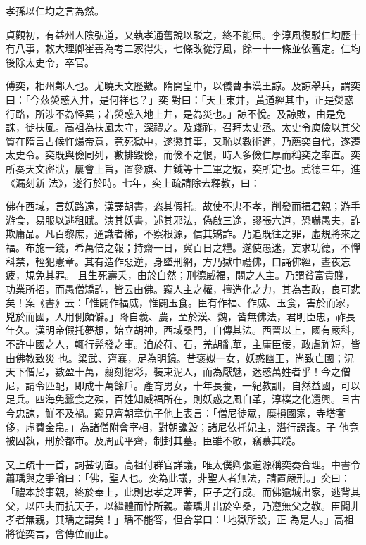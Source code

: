 \begin{pinyinscope}
 孝孫以仁均之言為然。



 貞觀初，有益州人陰弘道，又執孝通舊說以駁之，終不能屈。李淳風復駁仁均歷十有八事，敕大理卿崔善為考二家得失，七條改從淳風，餘一十一條並依舊定。仁均後除太史令，卒官。



 傅奕，相州鄴人也。尤曉天文歷數。隋開皇中，以儀曹事漢王諒。及諒舉兵，謂奕曰：「今茲熒惑入井，是何祥也？」奕
 對曰：「天上東井，黃道經其中，正是熒惑行路，所涉不為怪異；若熒惑入地上井，是為災也。」諒不悅。及諒敗，由是免誅，徙扶風。高祖為扶風太守，深禮之。及踐祚，召拜太史丞。太史令庾儉以其父質在隋言占候忤煬帝意，竟死獄中，遂懲其事，又恥以數術進，乃薦奕自代，遂遷太史令。奕既與儉同列，數排毀儉，而儉不之恨，時人多儉仁厚而稱奕之率直。奕所奏天文密狀，屢會上旨，置參旗、井鉞等十二軍之號，奕所定也。武德三年，進《漏刻新
 法》，遂行於時。七年，奕上疏請除去釋教，曰：



 佛在西域，言妖路遠，漢譯胡書，恣其假托。故使不忠不孝，削發而揖君親；游手游食，易服以逃租賦。演其妖書，述其邪法，偽啟三途，謬張六道，恐嚇愚夫，詐欺庸品。凡百黎庶，通識者稀，不察根源，信其矯詐。乃追既往之罪，虛規將來之福。布施一錢，希萬倍之報；持齋一日，冀百日之糧。遂使愚迷，妄求功德，不憚科禁，輕犯憲章。其有造作惡逆，身墜刑網，方乃獄中禮佛，口誦佛經，晝夜忘疲，規免其罪。
 且生死壽夭，由於自然；刑德威福，關之人主。乃謂貧富貴賤，功業所招，而愚僧矯詐，皆云由佛。竊人主之權，擅造化之力，其為害政，良可悲矣！案《書》云：「惟闢作福威，惟闢玉食。臣有作福、作威、玉食，害於而家，兇於而國，人用側頗僻。」降自羲、農，至於漢、魏，皆無佛法，君明臣忠，祚長年久。漢明帝假托夢想，始立胡神，西域桑門，自傳其法。西晉以上，國有嚴科，不許中國之人，輒行髡發之事。洎於苻、石，羌胡亂華，主庸臣佞，政虐祚短，皆由佛教致災
 也。梁武、齊襄，足為明鏡。昔褒姒一女，妖惑幽王，尚致亡國；況天下僧尼，數盈十萬，翦刻繒彩，裝束泥人，而為厭魅，迷惑萬姓者乎！今之僧尼，請令匹配，即成十萬餘戶。產育男女，十年長養，一紀教訓，自然益國，可以足兵。四海免蠶食之殃，百姓知威福所在，則妖惑之風自革，淳樸之化還興。且古今忠諫，鮮不及禍。竊見齊朝章仇子他上表言：「僧尼徒眾，糜損國家，寺塔奢侈，虛費金帛。」為諸僧附會宰相，對朝讒毀；諸尼依托妃主，潛行謗讟。子
 他竟被囚執，刑於都市。及周武平齊，制封其墓。臣雖不敏，竊慕其蹤。



 又上疏十一首，詞甚切直。高祖付群官詳議，唯太僕卿張道源稱奕奏合理。中書令蕭瑀與之爭論曰：「佛，聖人也。奕為此議，非聖人者無法，請置嚴刑。」奕曰：「禮本於事親，終於奉上，此則忠孝之理著，臣子之行成。而佛逾城出家，逃背其父，以匹夫而抗天子，以繼體而悖所親。蕭瑀非出於空桑，乃遵無父之教。臣聞非孝者無親，其瑀之謂矣！」瑀不能答，但合掌曰：「地獄所設，正
 為是人。」高祖將從奕言，會傳位而止。




\end{pinyinscope}
